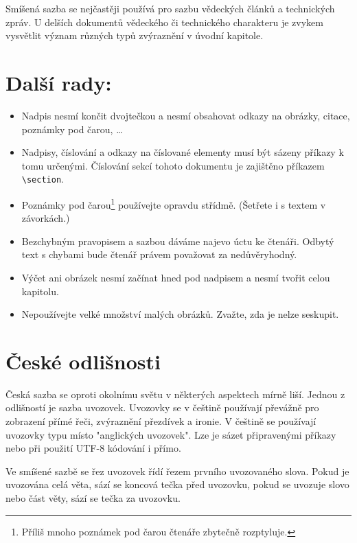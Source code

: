 \documentclass[hidelinks, twocolumn, a4paper]{article}
\begin{document}
Smíšená sazba se nejčastěji používá pro sazbu vědeckých článků a technických zpráv.
U delších dokumentů vědeckého či technického charakteru je zvykem vysvětlit význam různých typů zvýraznění v úvodní kapitole.

\section{Další rady:}
\label{sec3}

\begin{itemize}
    \item Nadpis nesmí končit dvojtečkou a nesmí obsahovat odkazy na obrázky, citace, poznámky pod čarou, \dots
    \item Nadpisy, číslování a odkazy na číslované elementy musí být sázeny příkazy k tomu určenými.
    Číslování sekcí tohoto dokumentu je zajištěno příkazem \verb|\section|.
    \item Poznámky pod čarou\footnote{Příliš mnoho poznámek pod čarou čtenáře zbytečně rozptyluje.} používejte opravdu střídmě.
        (Šetřete i s textem v závorkách.)
    \item Bezchybným pravopisem a sazbou dáváme najevo úctu ke čtenáři.
    Odbytý text s chybami bude čtenář právem považovat za nedůvěryhodný.
    \item Výčet ani obrázek nesmí začínat hned pod nadpisem a nesmí tvořit celou kapitolu.
    \item Nepoužívejte velké množství malých obrázků.
    Zvažte, zda je nelze seskupit.
\end{itemize}

\section{České odlišnosti}
\label{sec4}

Česká sazba se oproti okolnímu světu v některých aspektech mírně liší.
Jednou z odlišností je sazba uvozovek.
Uvozovky se v češtině používají převážně pro zobrazení přímé řeči, zvýraznění přezdívek a ironie.
V češtině se používají uvozovky typu  místo "anglických uvozovek".
Lze je sázet připravenými příkazy nebo při použití UTF-8 kódování i přímo.

Ve smíšené sazbě se řez uvozovek řídí řezem prvního uvozovaného slova.
Pokud je uvozována celá věta, sází se koncová tečka před uvozovku, pokud se uvozuje slovo nebo část věty, sází se tečka za uvozovku.
\end{document}
